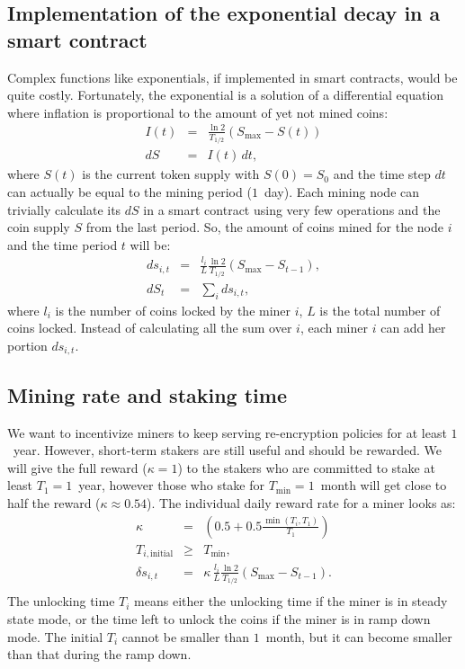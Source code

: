 \documentclass[longbibliography,nofootinbib,twocolumn]{revtex4-1}
\begin{document}
\subsection{Implementation of the exponential decay in a smart contract}

Complex functions like exponentials, if implemented in smart contracts, would be quite costly.
Fortunately, the exponential is a solution of a differential equation where inflation is proportional to the amount of yet not mined coins:
\begin{eqnarray}
    I(t) &=& \frac{\ln{2}}{T_{1/2}} \left( S_{\max} - S(t) \right)\\
    dS &=& I(t)\, dt,
\end{eqnarray}
where $S(t)$ is the current token supply with $S(0)=S_0$ and the time step $dt$ can actually be equal to the mining period ($1$~day).
Each mining node can trivially calculate its $dS$ in a smart contract using very few operations and the coin supply $S$ from the last period.
So, the amount of coins mined for the node $i$ and the time period $t$ will be:
\begin{eqnarray}
    \label{eq:rate-max}
    ds_{i,t} &=& \frac{l_i}{L} \frac{\ln{2}}{T_{1/2}} \left( S_{\max} - S_{t-1} \right),\\
    dS_t &=& \sum_i ds_{i,t},
\end{eqnarray}
where $l_i$ is the number of coins locked by the miner $i$, $L$ is the total number of coins locked.
Instead of calculating all the sum over $i$, each miner $i$ can add her portion $ds_{i,t}$.

\subsection{Mining rate and staking time}

We want to incentivize miners to keep serving re-encryption policies for at least $1$~year.
However, short-term stakers are still useful and should be rewarded.
We will give the full reward ($\kappa=1$) to the stakers who are committed to stake at least $T_1=1$~year,
however those who stake for $T_{\min}=1$~month will get close to half the reward ($\kappa\approx0.54$).
The individual daily reward rate for a miner looks as:
\begin{eqnarray}
    \kappa &=& \left(0.5 + 0.5\frac{\min(T_i, T_1)}{T_1}\right)\\
    T_{i,\text{initial}} &\ge& T_{\min},\\
    \delta s_{i,t} &=&  \kappa\, \frac{l_i}{L} \frac{\ln{2}}{T_{1/2}} \left( S_{\max} - S_{t-1}\right).\\
\end{eqnarray}
The unlocking time $T_i$ means either the unlocking time if the miner is in steady state mode,
or the time left to unlock the coins if the miner is in ramp down mode.
The initial $T_i$ cannot be smaller than $1$~month,
but it can become smaller than that during the ramp down.
\end{document}
